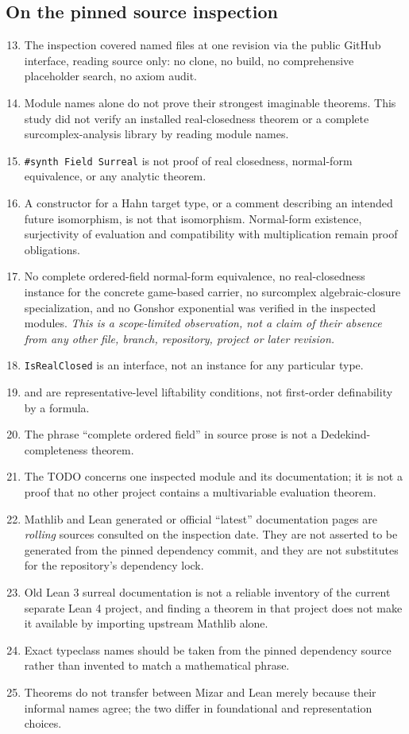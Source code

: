 \documentclass[11pt,letterpaper]{article}
\numberwithin{equation}{section}
\theoremstyle{definition}
\theoremstyle{remark}
\begin{document}
\subsection{On the pinned source inspection}
\label{found:app:liminspection}
\begin{enumerate}\setcounter{enumi}{12}
\item The inspection covered named files at one revision via the public GitHub
interface, reading source only: no clone, no build, no comprehensive placeholder
search, no axiom audit.
\item Module names alone do not prove their strongest imaginable theorems. This
study did not verify an installed real-closedness theorem or a complete
surcomplex-analysis library by reading module names.
\item \texttt{\#synth Field Surreal} is not proof of real closedness,
normal-form equivalence, or any analytic theorem.
\item A constructor for a Hahn target type, or a comment describing an intended
future isomorphism, is not that isomorphism. Normal-form existence, surjectivity
of evaluation and compatibility with multiplication remain proof obligations.
\item No complete ordered-field normal-form equivalence, no real-closedness
instance for the concrete game-based carrier, no surcomplex algebraic-closure
specialization, and no Gonshor exponential was verified in the inspected
modules. \emph{This is a scope-limited observation, not a claim of their absence
from any other file, branch, repository, project or later revision.}
\item \texttt{IsRealClosed} is an interface, not an instance for any particular
type.
\item {} and  are
representative-level liftability conditions, not first-order definability by a
formula.
\item The phrase ``complete ordered field'' in source prose is not a
Dedekind-completeness theorem.
\item The  TODO concerns one inspected module and
its documentation; it is not a proof that no other project contains a
multivariable evaluation theorem.
\item Mathlib and Lean generated or official ``latest'' documentation pages are
\emph{rolling} sources consulted on the inspection date. They are not asserted to
be generated from the pinned dependency commit, and they are not substitutes for
the repository's dependency lock.
\item Old Lean 3 surreal documentation is not a reliable inventory of the
current separate Lean 4 project, and finding a theorem in that project does not
make it available by importing upstream Mathlib alone.
\item Exact typeclass names should be taken from the pinned dependency source
rather than invented to match a mathematical phrase.
\item Theorems do not transfer between Mizar and Lean merely because their
informal names agree; the two differ in foundational and representation choices.
\end{enumerate}
\end{document}
